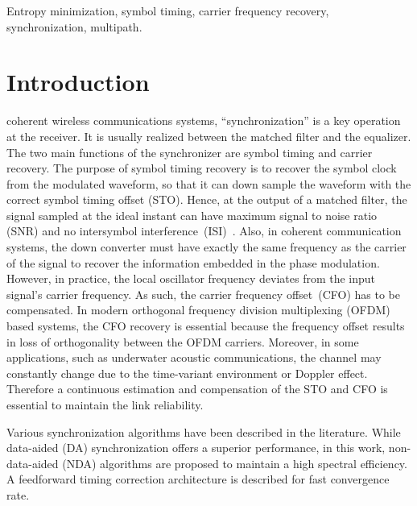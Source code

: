 \documentclass[12pt, draftclsnofoot, onecolumn]{IEEEtran}
\begin{document}
\begin{IEEEkeywords}
Entropy minimization, symbol timing, carrier frequency recovery, synchronization, multipath.
\end{IEEEkeywords}

\IEEEpeerreviewmaketitle

\section{Introduction}
\label{sec:intro}
 coherent wireless communications systems, ``synchronization'' is a key operation at the receiver.
It is usually realized between the matched filter and the equalizer.
The two main functions of the synchronizer are symbol timing and carrier recovery.
The purpose of symbol timing recovery is to recover the symbol clock from the modulated waveform, so that it can down sample the waveform with the correct symbol timing offset (STO).
Hence, at the output of a matched filter, the signal sampled at the ideal instant can have maximum signal to noise ratio (SNR) and no intersymbol interference~(ISI)~\cite{mengali1997synchronization}.
Also, in coherent communication systems, the down converter must have exactly the same frequency as the carrier of the signal to recover the information embedded in the phase modulation. 
However, in practice, the local oscillator frequency deviates from the input signal's carrier frequency. 
As such, the carrier frequency offset~(CFO) has to be compensated. 
In modern orthogonal frequency division multiplexing (OFDM) based systems, the CFO recovery is essential because the frequency offset results in loss of orthogonality between the OFDM carriers.
Moreover, in some applications, such as underwater acoustic communications, the channel may constantly change due to the time-variant environment or Doppler effect. 
Therefore a continuous estimation and compensation of the STO and CFO is essential to maintain the link reliability.

Various synchronization algorithms have been described in the literature.
While data-aided (DA) synchronization offers a superior performance, in this work, non-data-aided (NDA) algorithms are proposed to maintain a high spectral efficiency.
A feedforward timing correction architecture is described for fast convergence rate. 
\end{document}
